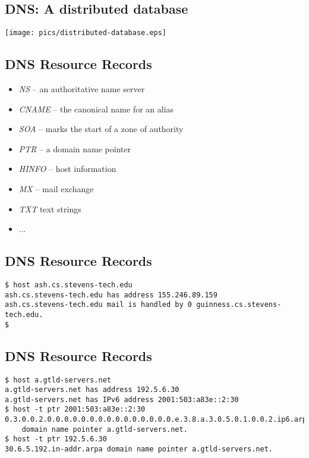 \documentclass[xga]{xdvislides}
\begin{document}
\subsection{DNS: A distributed database}
\vspace*{\fill}
\begin{center}
	\texttt{[image: pics/distributed-database.eps]}
\end{center}
\vspace*{\fill}


\subsection{DNS Resource Records}
\begin{itemize}
	\item {\em NS} -- an authoritative name server
	\item {\em CNAME} -- the canonical name for an alias
	\item {\em SOA} -- marks the start of a zone of authority
	\item {\em PTR} -- a domain name pointer
	\item {\em HINFO} -- host information
	\item {\em MX} -- mail exchange
	\item {\em TXT} text strings
	\item ...
\end{itemize}

\subsection{DNS Resource Records}
\begin{verbatim}
$ host ash.cs.stevens-tech.edu
ash.cs.stevens-tech.edu has address 155.246.89.159
ash.cs.stevens-tech.edu mail is handled by 0 guinness.cs.stevens-tech.edu.
$
\end{verbatim}

\subsection{DNS Resource Records}
\begin{verbatim}
$ host a.gtld-servers.net
a.gtld-servers.net has address 192.5.6.30
a.gtld-servers.net has IPv6 address 2001:503:a83e::2:30
$ host -t ptr 2001:503:a83e::2:30
0.3.0.0.2.0.0.0.0.0.0.0.0.0.0.0.0.0.0.0.e.3.8.a.3.0.5.0.1.0.0.2.ip6.arpa
    domain name pointer a.gtld-servers.net.
$ host -t ptr 192.5.6.30
30.6.5.192.in-addr.arpa domain name pointer a.gtld-servers.net.
\end{verbatim}
\end{document}
